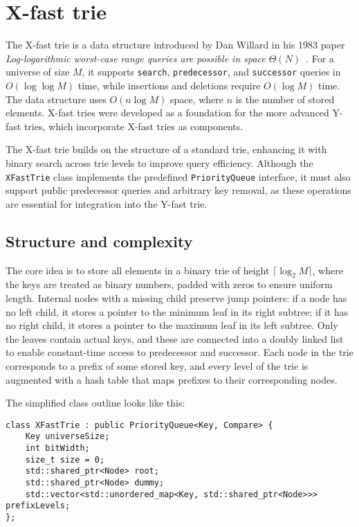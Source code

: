 \section{X-fast trie}
The X-fast trie is a data structure introduced by Dan Willard in his 1983 paper \emph{Log-logarithmic worst-case range queries are possible in space \( \Theta(N) \)}~\cite{Willard1983}. For a universe of size \( M \), it supports \texttt{search}, \texttt{predecessor}, and \texttt{successor} queries in \( O(\log \log M) \) time, while insertions and deletions require \( O(\log M) \) time. The data structure uses \( O(n \log M) \) space, where \( n \) is the number of stored elements. X-fast tries were developed as a foundation for  the more advanced Y-fast tries, which incorporate X-fast tries as components.

The X-fast trie builds on the structure of a standard trie, enhancing it with binary search across trie levels to improve query efficiency. Although the \texttt{XFastTrie} class implements the predefined \texttt{PriorityQueue} interface, it must also support public predecessor queries and arbitrary key removal, as these operations are essential for integration into the Y-fast trie.

\subsection{Structure and complexity}
The core idea is to store all elements in a binary trie of height \( \lceil \log_2 M \rceil \), where the keys are treated as binary numbers, padded with zeros to ensure uniform length. Internal nodes with a missing child preserve jump pointers: if a node has no left child, it stores a pointer to the minimum leaf in its right subtree; if it has no right child, it stores a pointer to the maximum leaf in its left subtree. Only the leaves contain actual keys, and these are connected into a doubly linked list to enable constant-time access to predecessor and successor. Each node in the trie corresponds to a prefix of some stored key, and every level of the trie is augmented with a hash table that maps prefixes to their corresponding nodes.

The simplified class outline looks like this:
\begin{verbatim}
class XFastTrie : public PriorityQueue<Key, Compare> {
    Key universeSize;
    int bitWidth;
    size_t size = 0;
    std::shared_ptr<Node> root;
    std::shared_ptr<Node> dummy;
    std::vector<std::unordered_map<Key, std::shared_ptr<Node>>> prefixLevels;
};
\end{verbatim}

